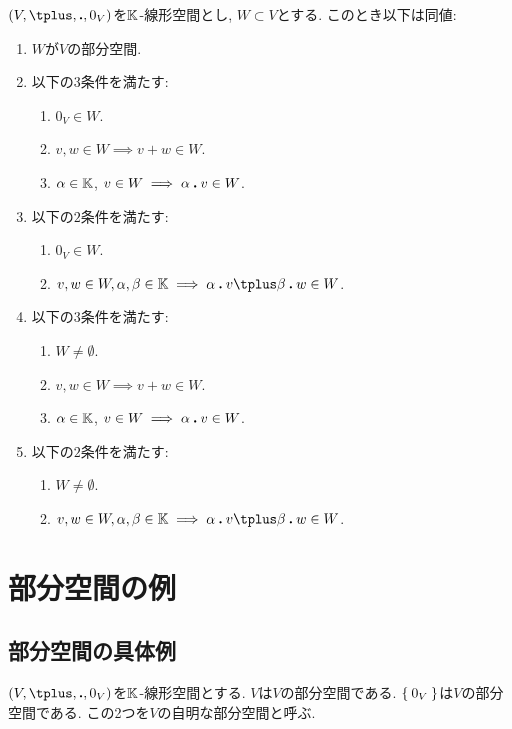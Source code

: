 \begin{lemma}
  $(V,\plus ,\act,0_V)$を$\mathbb{K}$-線形空間とし, $W\subset V$とする.
  このとき以下は同値:
  \begin{enumerate}
  \item $W$が$V$の部分空間.
  \item 以下の$3$条件を満たす:
    \begin{enumerate}
  \item $0_V\in W$.
  \item $v,w\in W \implies v\plus w\in W$.
  \item $\alpha\in\mathbb{K}$, $v\in W \implies \alpha\mathbin{\boldsymbol{.}} v\in W$.
    \end{enumerate}
  \item 以下の$2$条件を満たす:
    \begin{enumerate}
  \item $0_V\in W$.
  \item $v,w\in W, \alpha,\beta\in\KK \implies \alpha\act v\plus \beta\act w\in W$.
    \end{enumerate}
  \item 以下の$3$条件を満たす:
    \begin{enumerate}
  \item $W\neq \emptyset$.
  \item $v,w\in W \implies v\plus w\in W$.
  \item $\alpha\in\mathbb{K}$, $v\in W \implies \alpha\mathbin{\boldsymbol{.}} v\in W$.
    \end{enumerate}
  \item 以下の$2$条件を満たす:
    \begin{enumerate}
  \item $W\neq \emptyset$.
  \item $v,w\in W, \alpha,\beta\in\KK \implies \alpha\act v\plus \beta\act w\in W$.
    \end{enumerate}
  \end{enumerate}
\end{lemma}

\section{部分空間の例}
\subsection{部分空間の具体例}
\begin{example}
  $(V,\plus ,\act,0_V)$を$\mathbb{K}$-線形空間とする.
  $V$は$V$の部分空間である.
  $\Set{0_V}$は$V$の部分空間である.
  この2つを$V$の自明な部分空間と呼ぶ.
\end{example}

